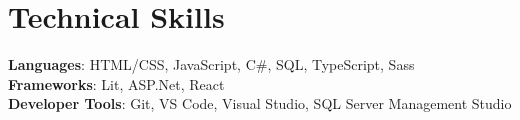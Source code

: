 \documentclass[letterpaper,11pt]{article}
\begin{document}
\section{Technical Skills}
 \begin{itemize}[leftmargin=0.15in, label={}]
    \small{\item{
     \textbf{Languages}{: HTML/CSS, JavaScript, C\#, SQL, TypeScript, Sass} \\
     \textbf{Frameworks}{: Lit, ASP.Net, React} \\
     \textbf{Developer Tools}{: Git, VS Code, Visual Studio, SQL Server Management Studio} \\
    }}
 \end{itemize}


\end{document}
